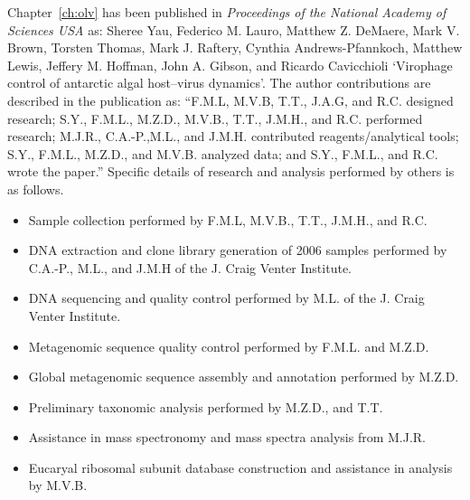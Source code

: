\documentclass[11pt,a4paper,twoside,openright]{report}
\begin{document}
Chapter~\ref{ch:olv} has been published in 
\textit{Proceedings of the National Academy of Sciences USA} as: 
Sheree Yau, Federico M. Lauro, Matthew Z. DeMaere, Mark V. Brown, Torsten Thomas, 
Mark J. Raftery, Cynthia Andrews-Pfannkoch, Matthew Lewis, Jeffery M. Hoffman, John A. Gibson, and 
Ricardo Cavicchioli `Virophage control of antarctic algal host--virus dynamics'. 
The author contributions are described in the publication as: 
``F.M.L, M.V.B, T.T., J.A.G, and R.C. designed research; 
S.Y., F.M.L., M.Z.D., M.V.B., T.T., J.M.H., and R.C. performed research; 
M.J.R., C.A.-P.,M.L., and J.M.H. contributed reagents/analytical tools; 
S.Y., F.M.L., M.Z.D., and M.V.B. analyzed data; 
and S.Y., F.M.L., and R.C. wrote the paper.''
Specific details of research and analysis performed by others is as follows. 
\begin{itemize}
\item Sample collection performed by F.M.L, M.V.B., T.T., J.M.H., and R.C.
\item DNA extraction and clone library generation of 2006 samples performed by C.A.-P., M.L., and 
J.M.H of the J. Craig Venter Institute.
\item DNA sequencing and quality control performed by M.L. of the J. Craig Venter Institute.
\item Metagenomic sequence quality control performed by F.M.L. and M.Z.D.
\item Global metagenomic sequence assembly and annotation performed by M.Z.D.
\item Preliminary taxonomic analysis performed by M.Z.D., and T.T.
\item Assistance in mass spectronomy and mass spectra analysis from M.J.R.
\item Eucaryal ribosomal subunit database construction and assistance in analysis by M.V.B.
\end{itemize}


\begin{abstract}
\end{abstract}

\tableofcontents
\listoffigures
\listoftables
















\end{document}

